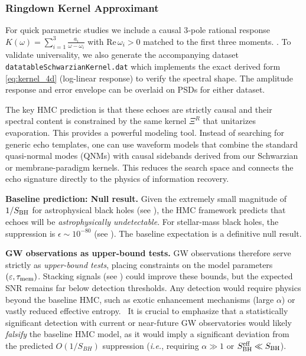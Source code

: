 \documentclass[aps,prd,preprint,onecolumn,superscriptaddress,nofootinbib,longbibliography,floatfix,11pt,showpacs,showkeys]{revtex4-2}
\newcommand{\ie}{\textit{i.e.}\xspace}
\newcommand{\HMC}{\textsc{HMC}\xspace}
\theoremstyle{plain}
\theoremstyle{definition}
\theoremstyle{remark}
\begin{document}
\subsubsection{Ringdown Kernel Approximant}
For quick parametric studies we include a causal 3‑pole rational response
$K(\omega)=\sum_{i=1}^3\frac{a_i}{\omega-\omega_i}$ with $\mathrm{Re}\,\omega_i>0$ matched to the
first three moments.
\cite{Cardoso:2016, Abedi:2017}. To validate universality, we also generate
the accompanying dataset \texttt{datatableSchwarzianKernel.dat} which implements the exact derived form \eqref{eq:kernel_4d} (log-linear response) to verify the spectral shape.
The amplitude response and error envelope can be overlaid on PSDs for either dataset.

The key \HMC{} prediction is that these echoes are strictly causal and their spectral content is constrained by the same kernel $\Xi^R$ that unitarizes evaporation. This provides a powerful modeling tool. Instead of searching for generic echo templates, one can use waveform models that combine the standard quasi-normal modes (QNMs) with causal sidebands derived from our Schwarzian or membrane-paradigm kernels. This reduces the search space and connects the echo signature directly to the physics of information recovery. 

\textbf{Baseline prediction: Null result.} Given the extremely small magnitude of $1/S_{\rm BH}$ for astrophysical black holes (see ), the \HMC{} framework predicts that echoes will be \emph{astrophysically undetectable}. For stellar-mass black holes, the suppression is $\epsilon\sim 10^{-80}$ (see ). The baseline expectation is a definitive null result.

\textbf{GW observations as upper-bound tests.} GW observations therefore serve strictly as \emph{upper-bound tests}, placing constraints on the model parameters $(\varepsilon,\tau_{\rm mem})$. Stacking signals (see ) could improve these bounds, but the expected SNR remains far below detection thresholds. Any detection would require physics beyond the baseline \HMC{}, such as exotic enhancement mechanisms (large $\alpha$) or vastly reduced effective entropy.
\ It is crucial to emphasize that a statistically significant detection with current or near-future GW observatories would likely \emph{falsify} the baseline \HMC{} model, as it would imply a significant deviation from the predicted $O(1/S_{BH})$ suppression (\ie, requiring $\alpha \gg 1$ or $S_{\rm BH}^{\rm eff} \ll S_{\rm BH}$).
\end{document}
